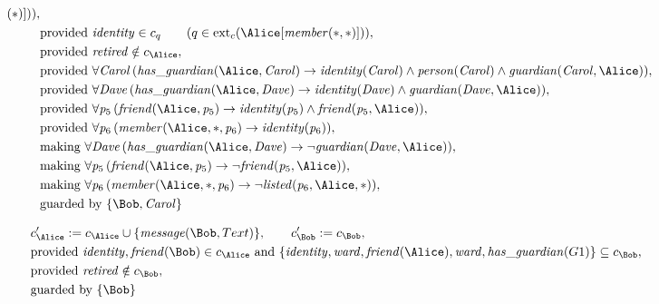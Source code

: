 \begin{align*}
{{}}
(
\ast
)
]
)
)
,\\
&
\text{provided } 
\mathit{\detokenize{
identity
}}
 \in c_
q
 \qquad (
q \in 
\mathrm{ext}_c(
\Alice
[
\mathit{\detokenize{
member
}}
(
\ast
,
\ast
)
]
)
)
,\\
&
\text{provided } 
\mathit{\detokenize{
retired
}}
 \notin c_
{
\Alice
}
,\\
&
\text{provided } 
\forall 
\mathit{Carol}
\,(
\mathit{\detokenize{
has_guardian
}}
(
\Alice
,
\mathit{Carol}
)
\rightarrow
\mathit{\detokenize{
identity
}}
(
\mathit{Carol}
)
\land
\mathit{\detokenize{
person
}}
(
\mathit{Carol}
)
\land
\mathit{\detokenize{
guardian
}}
(
\mathit{Carol}
,
\Alice
)
)
,\\
&
\text{provided } 
\forall 
\mathit{Dave}
\,(
\mathit{\detokenize{
has_guardian
}}
(
\Alice
,
\mathit{Dave}
)
\rightarrow
\mathit{\detokenize{
identity
}}
(
\mathit{Dave}
)
\land
\mathit{\detokenize{
guardian
}}
(
\mathit{Dave}
,
\Alice
)
)
,\\
&
\text{provided } 
\forall 
\mathit{p}_{
5
}
\,(
\mathit{\detokenize{
friend
}}
(
\Alice
,
\mathit{p}_{
5
}
)
\rightarrow
\mathit{\detokenize{
identity
}}
(
\mathit{p}_{
5
}
)
\land
\mathit{\detokenize{
friend
}}
(
\mathit{p}_{
5
}
,
\Alice
)
)
,\\
&
\text{provided } 
\forall 
\mathit{p}_{
6
}
\,(
\mathit{\detokenize{
member
}}
(
\Alice
,
\ast
,
\mathit{p}_{
6
}
)
\rightarrow
\mathit{\detokenize{
identity
}}
(
\mathit{p}_{
6
}
)
)
,\\
&
\text{making } 
\forall 
\mathit{Dave}
\,(
\mathit{\detokenize{
has_guardian
}}
(
\Alice
,
\mathit{Dave}
)
\rightarrow
\neg 
\mathit{\detokenize{
guardian
}}
(
\mathit{Dave}
,
\Alice
)
)
,\\
&
\text{making } 
\forall 
\mathit{p}_{
5
}
\,(
\mathit{\detokenize{
friend
}}
(
\Alice
,
\mathit{p}_{
5
}
)
\rightarrow
\neg 
\mathit{\detokenize{
friend
}}
(
\mathit{p}_{
5
}
,
\Alice
)
)
,\\
&
\text{making } 
\forall 
\mathit{p}_{
6
}
\,(
\mathit{\detokenize{
member
}}
(
\Alice
,
\ast
,
\mathit{p}_{
6
}
)
\rightarrow
\neg 
\mathit{\detokenize{
listed
}}
(
\mathit{p}_{
6
}
,
\Alice
,
\ast
)
)
,\\
&
\text{guarded by } \{
\Bob
,
\mathit{Carol}
\}
\end{align*}

\begin{align*}
&
c'_
{
\Alice
}
 := 
c_
{
\Alice
}
 \cup 
\{
\mathit{\detokenize{
message
}}
(
\Bob
,
Text
)
\}
, \qquad 
c'_
{
\Bob
}
 := 
c_
{
\Bob
}
,\\
&
\text{provided } 
\mathit{\detokenize{
identity
}}
,
\mathit{\detokenize{
friend
}}
(
\Bob
)
 \in c_
{
\Alice
}
 \text{ and } 
\{
\mathit{\detokenize{
identity
}}
,
\mathit{\detokenize{
ward
}}
,
\mathit{\detokenize{
friend
}}
(
\Alice
)
,
\mathit{\detokenize{
ward
}}
,
\mathit{\detokenize{
has_guardian
}}
(
G1
)
\}
 \subseteq c_
{
\Bob
}
,\\
&
\text{provided } 
\mathit{\detokenize{
retired
}}
 \notin c_
{
\Bob
}
,\\
&
\text{guarded by } \{
\Bob
\}
\end{align*}
